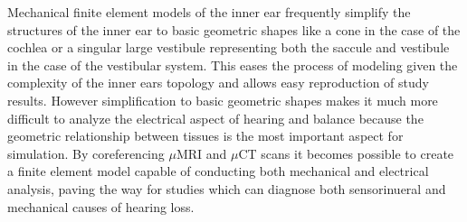 \documentclass[12pt]{article}
\begin{document}
  Mechanical finite element models of the inner ear frequently simplify the structures of the inner ear to basic geometric shapes like a cone in the case of the cochlea or a singular large vestibule representing both the saccule and vestibule in the case of the vestibular system. This eases the process of modeling given the complexity of the inner ears topology and allows easy reproduction of study results. However simplification to basic geometric shapes makes it much more difficult to analyze the electrical aspect of hearing and balance because the geometric relationship between tissues is the most important aspect for simulation. By coreferencing $\mu$MRI and $\mu$CT scans it becomes possible to create a finite element model capable of conducting both mechanical and electrical analysis, paving the way for studies which can diagnose both sensorinueral and mechanical causes of hearing loss.
   
%
%
\end{document}
